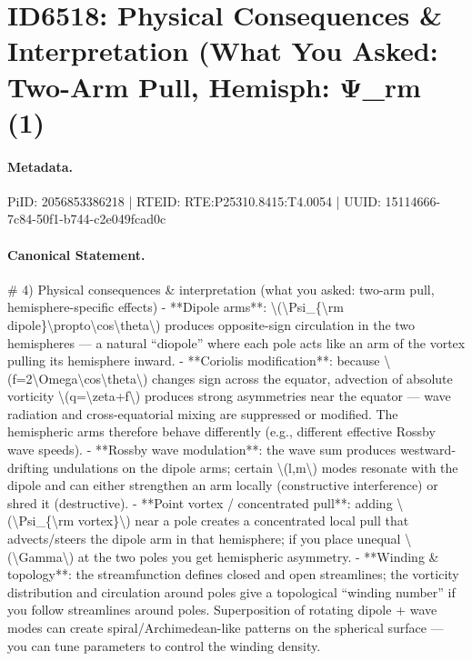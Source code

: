 \section*{ID6518: Physical Consequences \& Interpretation (What You Asked: Two-Arm Pull, Hemisph: Ψ\_rm (1)}
\paragraph{Metadata.}
PiID: 2056853386218 | RTEID: RTE:P25310.8415:T4.0054 | UUID: 15114666-7c84-50f1-b744-c2e049fcad0c

\paragraph{Canonical Statement.}
\# 4) Physical consequences \& interpretation (what you asked: two-arm pull, hemisphere-specific effects) - **Dipole arms**: \textbackslash{}(\textbackslash{}Psi\_\{\textbackslash{}rm dipole\}\textbackslash{}propto\textbackslash{}cos\textbackslash{}theta\textbackslash{}) produces opposite-sign circulation in the two hemispheres — a natural “diopole” where each pole acts like an arm of the vortex pulling its hemisphere inward. - **Coriolis modification**: because \textbackslash{}(f=2\textbackslash{}Omega\textbackslash{}cos\textbackslash{}theta\textbackslash{}) changes sign across the equator, advection of absolute vorticity \textbackslash{}(q=\textbackslash{}zeta+f\textbackslash{}) produces strong asymmetries near the equator — wave radiation and cross-equatorial mixing are suppressed or modified. The hemispheric arms therefore behave differently (e.g., different effective Rossby wave speeds). - **Rossby wave modulation**: the wave sum produces westward-drifting undulations on the dipole arms; certain \textbackslash{}(l,m\textbackslash{}) modes resonate with the dipole and can either strengthen an arm locally (constructive interference) or shred it (destructive). - **Point vortex / concentrated pull**: adding \textbackslash{}(\textbackslash{}Psi\_\{\textbackslash{}rm vortex\}\textbackslash{}) near a pole creates a concentrated local pull that advects/steers the dipole arm in that hemisphere; if you place unequal \textbackslash{}(\textbackslash{}Gamma\textbackslash{}) at the two poles you get hemispheric asymmetry. - **Winding \& topology**: the streamfunction defines closed and open streamlines; the vorticity distribution and circulation around poles give a topological “winding number” if you follow streamlines around poles. Superposition of rotating dipole + wave modes can create spiral/Archimedean-like patterns on the spherical surface — you can tune parameters to control the winding density.

